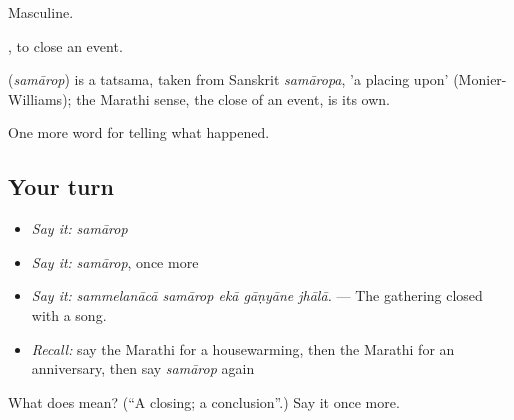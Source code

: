 Masculine.

 , to close an event.

\begin{cousinweb}
\textbf{} (\emph{samārop}) is a tatsama, taken from Sanskrit \emph{samāropa}, 'a placing upon' (Monier-Williams); the Marathi sense, the close of an event, is its own.
\end{cousinweb}

\begin{grammarlens}[title={What you've built}]
One more word for telling what happened.
\end{grammarlens}

\subsection*{Your turn}
\begin{itemize}
\raggedright
  \item \emph{Say it:} \emph{samārop}
  \item \emph{Say it:} \emph{samārop}, once more
  \item \emph{Say it:} \emph{sammelanācā samārop ekā gāṇyāne jhālā.} — The gathering closed with a song.
  \item \emph{Recall:} say the Marathi for a housewarming, then the Marathi for an anniversary, then say \emph{samārop} again
\end{itemize}

\begin{tcolorbox}[breakable,colback=teal!4,colframe=teal!35!black,title={Before you move on}]
What does  mean? (\textquotedblleft{}A closing; a conclusion\textquotedblright{}.) Say it once more.
\end{tcolorbox}
